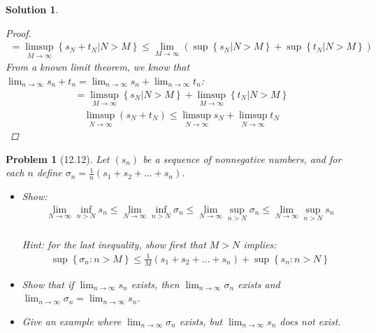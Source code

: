 \documentclass[12pt]{article}
\newtheorem{problem}{Problem}
\newtheorem{solution}{Solution}
\begin{document}
\begin{solution}
\begin{proof}
        \begin{align}
            =\limsup_{M \to \infty} \left\{ s_{N} +t_{N} |N>M \right\} \leq \lim_{M \to \infty} (\sup \left\{ s_{N} |N>M \right\} +\sup  \left\{ t_{N} |N>M \right\} )
        \end{align}
        From a known limit theorem, we know that $\lim_{n \to \infty} s_{n} +t_{n} =\lim_{n \to \infty} s_{n} +\lim_{n \to \infty} t_{n} $: 
        \begin{align}
            =\limsup_{M \to \infty} \left\{ s_{N} |N>M \right\} +\limsup_{M \to \infty} \left\{ t_{N} |N>M \right\} 
        \end{align}
        \begin{align}
            \limsup_{N \to \infty} (s_{N} +t_{N} )\leq \limsup_{N \to \infty} s_{N} + \limsup_{N \to \infty} t_{N} 
        \end{align}
   \end{proof} 
\end{solution}

\begin{problem}[12.12]
   Let $(s_{n} )$ be a sequence of nonnegative numbers, and for each $n$ define $\sigma_n=\frac{1}{n}(s_1 +s_2 +\dots +s_n )$.
   \begin{itemize}
    \item Show:
    \begin{align}
       \lim_{N \to \infty} \inf_{n>N}s_n \leq \lim_{N \to \infty} \inf_{n>N} \sigma_n \leq \lim_{N \to \infty} \sup_{n>N} \sigma_n \leq \lim_{N \to \infty} \sup_{n>N} s_n
    \end{align}\\
    Hint: for the last inequality, show first that $M>N$ implies:
    \begin{align}
        \sup \left\{ \sigma_n:n>M \right\} \leq \frac{1}{M}(s_1 +s_2 + \dots +s_n)+\sup \left\{ s_n:n>N \right\}
    \end{align}
    \item Show that if $\lim_{n \to \infty} s_n$ exists, then $\lim_{n \to \infty} \sigma_n$ exists and $\lim_{n \to \infty} \sigma_n=\lim_{n \to \infty} s_n$.  
    \item Give an example where $\lim_{n \to \infty} \sigma_n$ exists, but $\lim_{n \to \infty} s_{n} $ does not exist.  
   \end{itemize}   
\end{problem}
\end{document}
